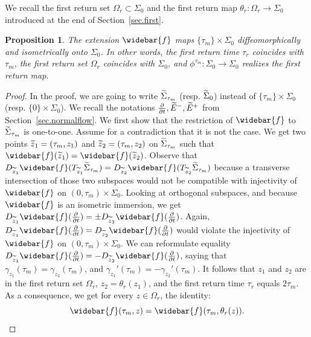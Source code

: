 \documentclass[11pt]{article}
\newtheorem{prop}[theo]{Proposition}
\theoremstyle{definition}
\numberwithin{equation}{section}
\numberwithin{figure}{section}
\numberwithin{table}{section}
\let\oldtilde\tilde
\renewcommand*\tilde[1]{\mathchoice{\widetilde{#1}}{\widetilde{#1}}{\widetilde{#1}}{\oldtilde{#1}}}
\let\oldbar\bar
\renewcommand*{\bar}[1]{\mathchoice{\widebar{#1}}{\widebar{#1}}{\oldbar{#1}}{\oldbar{#1}}}
\renewcommand*{\overline}{\bar}
\begin{document}
We recall the first return set $\Omega_r \subset \Sigma_0$ and the first return map $\theta_r: \Omega_r \to \Sigma_0$ introduced at the end of Section~\ref{sec.first}.

\begin{prop}
The extension ${\overline{f}}$ maps $\{ \tau_m\} \times {\Sigma}_{0}$ diffeomorphically and isometrically onto $\Sigma_0$. In other words, the first return time $\tau_r$ coincides with $\tau_m$, the first return set $\Omega_r$ coincides with $\Sigma_0$, and $\phi^{\tau_m}: \Sigma_0 \to \Sigma_0$ realizes the first return map.
\end{prop}

\begin{proof}
In the proof, we are going to write $\tilde{\Sigma}_{\tau_m}$ (resp. $\tilde{\Sigma}_0$) instead of
$\{\tau_m \} \times \Sigma_0$ (resp. $\{0\} \times \Sigma_0$). We recall the notations $\frac{\partial}{\partial t}, \tilde{E}^-,\tilde{E}^+$ from Section~\ref{sec.normalflow}. We first show that the restriction of ${\overline{f}}$ to $\tilde{\Sigma}_{\tau_m}$ is one-to-one. Assume for a contradiction that it is not the case. We get two points $\tilde{z}_1=(\tau_m,z_1)$ and $\tilde{z}_2=(\tau_m,z_2)$ on $\tilde{\Sigma}_{\tau_m}$ such that ${\overline{f}}(\tilde{z}_1)={\overline{f}}(\tilde{z}_2)$. Observe that $D_{\tilde{z}_1}{\overline{f}}(T_{\tilde{z}_1}\tilde{\Sigma}_{\tau_m})=D_{\tilde{z}_2}{\overline{f}}(T_{\tilde{z}_2}\tilde{\Sigma}_{\tau_m})$ because a transverse intersection of those two subspaces would not be compatible with injectivity of ${\overline{f}}$ on $(0,\tau_m) \times \Sigma_0$. Looking at orthogonal subspaces, and because ${\overline{f}}$ is an isometric immersion, we get $D_{\tilde{z}_1}{\overline{f}}(\frac{\partial}{\partial t})=\pm D_{\tilde{z}_2}{\overline{f}}(\frac{\partial}{\partial t})$. Again, $D_{\tilde{z}_1}{\overline{f}}(\frac{\partial}{\partial t})= D_{\tilde{z}_2}{\overline{f}}(\frac{\partial}{\partial t})$ would violate the injectivity of ${\overline{f}}$ on $(0,\tau_m) \times \Sigma_0$. We can reformulate equality $D_{\tilde{z}_1}{\overline{f}}(\frac{\partial}{\partial t})=- D_{\tilde{z}_2}{\overline{f}}(\frac{\partial}{\partial t})$, saying that $\gamma_{z_1}(\tau_m)=\gamma_{z_2}(\tau_m)$, and $\gamma_{z_1}'(\tau_m)=-\gamma_{z_2}'(\tau_m)$. It follows that $z_1$ and $z_2$ are in the first return set $\Omega_r$, $z_2=\theta_r(z_1)$, and the first return time $\tau_r$ equals $2 \tau_m$. As a consequence, we get for every $z \in \Omega_r$, the identity:
\[
{\overline{f}}(\tau_m,z)={\overline{f}}(\tau_m,\theta_r(z)).
\]
\end{proof}
\end{document}
